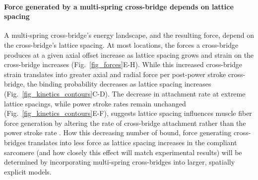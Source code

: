 \documentclass[]{article}
\begin{document}
\paragraph{Force generated by a multi-spring cross-bridge depends on lattice spacing} %
A multi-spring cross-bridge's energy landscape, and the resulting force, depend on the cross-bridge's lattice spacing.
At most locations, the forces a cross-bridge produces at a given axial offset increase as lattice spacing grows and strain on the cross-bridge increases (Fig.~\ref{fig_forces}E-H). 
While this increased cross-bridge strain translates into greater axial and radial force per post-power stroke cross-bridge, the binding probability decreases as lattice spacing increases (Fig.~\ref{fig_kinetics_contours}C-D).
The decrease in attachment rate at extreme lattice spacings, while power stroke rates remain unchanged (Fig.~\ref{fig_kinetics_contours}E-F), suggests lattice spacing influences muscle fiber force generation by altering the rate of cross-bridge attachment rather than the power stroke rate \citep{Martyn2004}. 
How this decreasing number of bound, force generating cross-bridges translates into less force as lattice spacing increases in the compliant sarcomere (and how closely this effect will match experimental results) will be determined by incorporating multi-spring cross-bridges into larger, spatially explicit models. 
\end{document}
